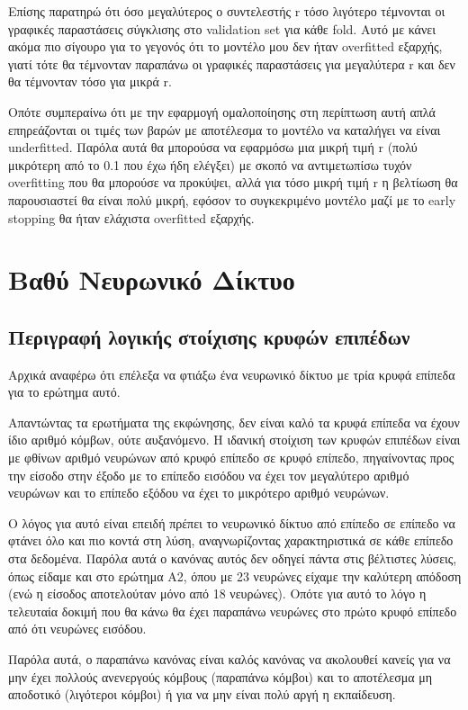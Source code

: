 \documentclass[12pt,a4paper]{article}
\begin{document}
Επίσης παρατηρώ ότι όσο μεγαλύτερος ο συντελεστής r τόσο λιγότερο τέμνονται οι γραφικές παραστάσεις σύγκλισης στο validation set για κάθε fold. Αυτό με κάνει ακόμα πιο σίγουρο για το γεγονός ότι το μοντέλο μου δεν ήταν overfitted εξαρχής, γιατί τότε θα τέμνονταν παραπάνω οι γραφικές παραστάσεις για μεγαλύτερα r και δεν θα τέμνονταν τόσο για μικρά r.

Οπότε συμπεραίνω ότι με την εφαρμογή ομαλοποίησης στη περίπτωση αυτή απλά επηρεάζονται οι τιμές των βαρών με αποτέλεσμα το μοντέλο να καταλήγει να είναι underfitted. Παρόλα αυτά θα μπορούσα να εφαρμόσω μια μικρή τιμή r (πολύ μικρότερη από το 0.1 που έχω ήδη ελέγξει) με σκοπό να αντιμετωπίσω τυχόν overfitting που θα μπορούσε να προκύψει, αλλά για τόσο μικρή τιμή r η βελτίωση θα παρουσιαστεί θα είναι πολύ μικρή, εφόσον το συγκεκριμένο μοντέλο μαζί με το early stopping θα ήταν ελάχιστα overfitted εξαρχής.

\section{Βαθύ Νευρωνικό Δίκτυο}

\subsection{Περιγραφή λογικής στοίχισης κρυφών επιπέδων}

Αρχικά αναφέρω ότι επέλεξα να φτιάξω ένα νευρωνικό δίκτυο με τρία κρυφά επίπεδα για το ερώτημα αυτό. 

Απαντώντας τα ερωτήματα της εκφώνησης, δεν είναι καλό τα κρυφά επίπεδα να έχουν ίδιο αριθμό κόμβων, ούτε αυξανόμενο. Η ιδανική στοίχιση των κρυφών επιπέδων είναι με φθίνων αριθμό νευρώνων από κρυφό επίπεδο σε κρυφό επίπεδο, πηγαίνοντας προς την είσοδο στην έξοδο με το επίπεδο εισόδου να έχει τον μεγαλύτερο αριθμό νευρώνων και το επίπεδο εξόδου να έχει το μικρότερο αριθμό νευρώνων. 

Ο λόγος για αυτό είναι επειδή πρέπει το νευρωνικό δίκτυο από επίπεδο σε επίπεδο να φτάνει όλο και πιο κοντά στη λύση, αναγνωρίζοντας χαρακτηριστικά σε κάθε επίπεδο στα δεδομένα. Παρόλα αυτά ο κανόνας αυτός δεν οδηγεί πάντα στις βέλτιστες λύσεις, όπως είδαμε και στο ερώτημα Α2, όπου με 23 νευρώνες είχαμε την καλύτερη απόδοση (ενώ η είσοδος αποτελούταν μόνο από 18 νευρώνες). Οπότε για αυτό το λόγο η τελευταία δοκιμή που θα κάνω θα έχει παραπάνω νευρώνες στο πρώτο κρυφό επίπεδο από ότι νευρώνες εισόδου.

Παρόλα αυτά, ο παραπάνω κανόνας είναι καλός κανόνας να ακολουθεί κανείς για να μην έχει πολλούς ανενεργούς κόμβους (παραπάνω κόμβοι) και το αποτέλεσμα μη αποδοτικό (λιγότεροι κόμβοι) ή για να μην είναι πολύ αργή η εκπαίδευση.
\end{document}
